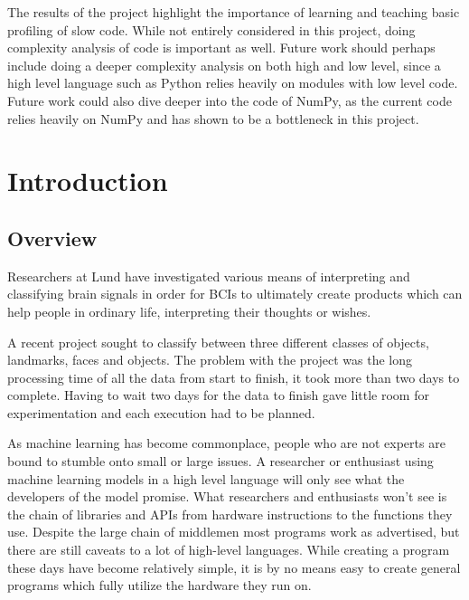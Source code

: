 \documentclass[12pt, a4paper]{article}
\begin{document}
The results of the project highlight the importance of learning and teaching basic profiling of slow code.
While not entirely considered in this project, doing complexity analysis of code is important as well.
Future work should perhaps include doing a deeper complexity analysis on both high and low level, since a high level language such as Python relies heavily on modules with low level code.
Future work could also dive deeper into the code of NumPy, as the current code relies heavily on NumPy and has shown to be a bottleneck in this project.

\newpage


\tableofcontents

\clearpage

\glsaddall
\renewcommand*{\arraystretch}{1.1}
\printglossary[type=main,style=long,nonumberlist]

\newpage

\section{Introduction}

\subsection{Overview}

Researchers at Lund have investigated various means of interpreting and classifying brain signals in order for BCIs to ultimately create products which can help people in ordinary life, interpreting their thoughts or wishes.

A recent project sought to classify between three different classes of objects, landmarks, faces and objects.
The problem with the project was the long processing time of all the data from start to finish, it took more than two days to complete.
Having to wait two days for the data to finish gave little room for experimentation and each execution had to be planned.

As machine learning has become commonplace, people who are not experts are bound to stumble onto small or large issues.
A researcher or enthusiast using machine learning models in a high level language will only see what the developers of the model promise.
What researchers and enthusiasts won't see is the chain of libraries and APIs from hardware instructions to the functions they use.
Despite the large chain of middlemen most programs work as advertised, but there are still caveats to a lot of high-level languages. 
While creating a program these days have become relatively simple, it is by no means easy to create general programs which fully utilize the hardware they run on.
\end{document}
